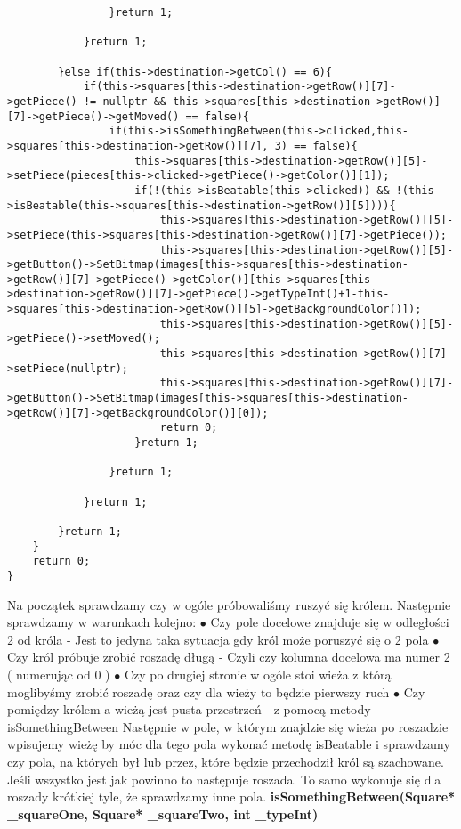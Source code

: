 \documentclass[]{report}
\begin{document}
\begin{flushleft}
\begin{lstlisting}
				}return 1;
				
			}return 1;
			
		}else if(this->destination->getCol() == 6){
			if(this->squares[this->destination->getRow()][7]->getPiece() != nullptr && this->squares[this->destination->getRow()][7]->getPiece()->getMoved() == false){
				if(this->isSomethingBetween(this->clicked,this->squares[this->destination->getRow()][7], 3) == false){
					this->squares[this->destination->getRow()][5]->setPiece(pieces[this->clicked->getPiece()->getColor()][1]);
					if(!(this->isBeatable(this->clicked)) && !(this->isBeatable(this->squares[this->destination->getRow()][5]))){
						this->squares[this->destination->getRow()][5]->setPiece(this->squares[this->destination->getRow()][7]->getPiece());
						this->squares[this->destination->getRow()][5]->getButton()->SetBitmap(images[this->squares[this->destination->getRow()][7]->getPiece()->getColor()][this->squares[this->destination->getRow()][7]->getPiece()->getTypeInt()+1-this->squares[this->destination->getRow()][5]->getBackgroundColor()]);
						this->squares[this->destination->getRow()][5]->getPiece()->setMoved();
						this->squares[this->destination->getRow()][7]->setPiece(nullptr);
						this->squares[this->destination->getRow()][7]->getButton()->SetBitmap(images[this->squares[this->destination->getRow()][7]->getBackgroundColor()][0]);
						return 0;
					}return 1;
					
				}return 1;
				
			}return 1;
			
		}return 1;
	}
	return 0;
}
\end{lstlisting}
\vspace{\baselineskip}
Na początek sprawdzamy czy w ogóle próbowaliśmy ruszyć się królem. Następnie sprawdzamy w warunkach kolejno:
\newline
$\bullet$ Czy pole docelowe znajduje się w odległości 2 od króla - Jest to jedyna taka sytuacja gdy król może poruszyć się o 2 pola\newline
$\bullet$ Czy król próbuje zrobić roszadę długą - Czyli czy kolumna docelowa ma numer 2 ( numerując od 0 )\newline
$\bullet$ Czy po drugiej stronie w ogóle stoi wieża z którą moglibyśmy zrobić roszadę oraz czy dla wieży to będzie pierwszy ruch\newline
$\bullet$ Czy pomiędzy królem a wieżą jest pusta przestrzeń - z pomocą metody isSomethingBetween\newline
Następnie w pole, w którym znajdzie się wieża po roszadzie wpisujemy wieżę by móc dla tego pola wykonać metodę isBeatable
i sprawdzamy czy pola, na których był lub przez, które będzie przechodził król są szachowane. Jeśli wszystko jest jak powinno to następuje roszada. To samo wykonuje się dla roszady krótkiej tyle, że sprawdzamy inne pola.
\vspace{\baselineskip}
\newline
\textbf{isSomethingBetween(Square* \_squareOne, Square* \_squareTwo, int \_typeInt)}


\end{flushleft}
\end{document}
